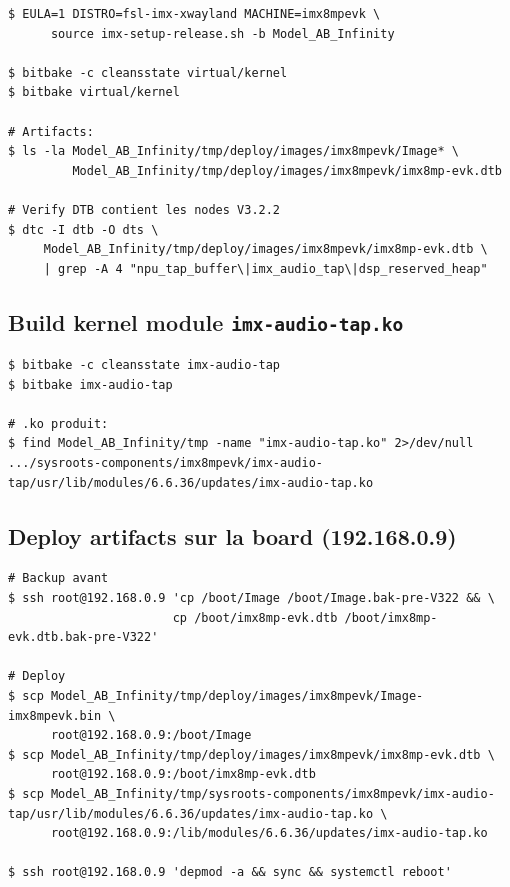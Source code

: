\documentclass[11pt,a4paper]{article}
\begin{document}
\begin{lstlisting}
$ EULA=1 DISTRO=fsl-imx-xwayland MACHINE=imx8mpevk \
      source imx-setup-release.sh -b Model_AB_Infinity

$ bitbake -c cleansstate virtual/kernel
$ bitbake virtual/kernel

# Artifacts:
$ ls -la Model_AB_Infinity/tmp/deploy/images/imx8mpevk/Image* \
         Model_AB_Infinity/tmp/deploy/images/imx8mpevk/imx8mp-evk.dtb

# Verify DTB contient les nodes V3.2.2
$ dtc -I dtb -O dts \
     Model_AB_Infinity/tmp/deploy/images/imx8mpevk/imx8mp-evk.dtb \
     | grep -A 4 "npu_tap_buffer\|imx_audio_tap\|dsp_reserved_heap"
\end{lstlisting}

\subsection{Build kernel module \texttt{imx-audio-tap.ko}}

\begin{lstlisting}
$ bitbake -c cleansstate imx-audio-tap
$ bitbake imx-audio-tap

# .ko produit:
$ find Model_AB_Infinity/tmp -name "imx-audio-tap.ko" 2>/dev/null
.../sysroots-components/imx8mpevk/imx-audio-tap/usr/lib/modules/6.6.36/updates/imx-audio-tap.ko
\end{lstlisting}

\subsection{Deploy artifacts sur la board (192.168.0.9)}

\begin{lstlisting}
# Backup avant
$ ssh root@192.168.0.9 'cp /boot/Image /boot/Image.bak-pre-V322 && \
                       cp /boot/imx8mp-evk.dtb /boot/imx8mp-evk.dtb.bak-pre-V322'

# Deploy
$ scp Model_AB_Infinity/tmp/deploy/images/imx8mpevk/Image-imx8mpevk.bin \
      root@192.168.0.9:/boot/Image
$ scp Model_AB_Infinity/tmp/deploy/images/imx8mpevk/imx8mp-evk.dtb \
      root@192.168.0.9:/boot/imx8mp-evk.dtb
$ scp Model_AB_Infinity/tmp/sysroots-components/imx8mpevk/imx-audio-tap/usr/lib/modules/6.6.36/updates/imx-audio-tap.ko \
      root@192.168.0.9:/lib/modules/6.6.36/updates/imx-audio-tap.ko

$ ssh root@192.168.0.9 'depmod -a && sync && systemctl reboot'
\end{lstlisting}
\end{document}
